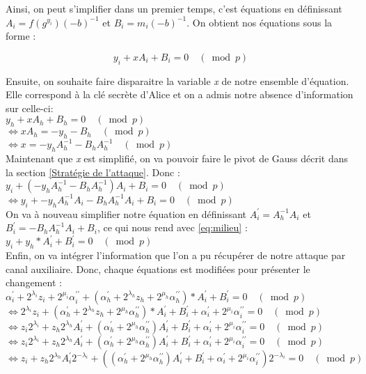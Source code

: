\documentclass{backend}
\begin{document}
Ainsi, on peut s'implifier dans un premier temps, c'est équations en définissant $ A_{i} =  f\left(g^{y_{i}}\right) (-b)^{-1}$ et $ B_{i} = m_{i}(-b)^{-1}$. On obtient nos équations sous la forme :

$$ y_{i}+x A_{i} + B_{i} = 0 \quad(\bmod p)$$

Ensuite, on souhaite faire disparaitre la variable \textit{x} de notre ensemble d'équation. Elle correspond à la clé secrète d'Alice et on a admis notre absence d'information sur celle-ci: \\
$ y_{h}+x A_{h} + B_{h} = 0 \quad(\bmod p)$\\
$ \Leftrightarrow x A_{h}= -y_{h} - B_{h} \quad(\bmod p)$\\
$ \Leftrightarrow x = -y_{h}A_{h}^{-1} - B_{h}A_{h}^{-1} \quad(\bmod p)$\\

Maintenant que \textit{x} est simplifié, on va pouvoir faire le pivot de Gauss décrit dans la section \ref{Stratégie de l'attaque}.
Donc : \\$ y_{i}+(-y_{h}A_{h}^{-1} - B_{h}A_{h}^{-1})A_{i} + B_{i} = 0 \quad(\bmod p)$\\
$ \Leftrightarrow y_{i}+-y_{h}A_{h}^{-1}A_{i} - B_{h}A_{h}^{-1}A_{i} + B_{i} = 0 \quad(\bmod p)$\\
On va à nouveau simplifier notre équation en définissant $ A^{\prime}_{i} = A_{h}^{-1}A_{i}$ et $ B^{\prime}_{i} = - B_{h}A_{h}^{-1}A_{i} + B_{i} $, ce qui nous rend avec \ref{eq:milieu} : $y_{i} + y_{h} * A^{\prime}_{i} + B^{\prime}_{i} = 0 \quad(\bmod p)$\\

Enfin, on va intégrer l'information que l'on a pu récupérer de notre attaque par canal auxiliaire. Donc, chaque équations est modifiées pour présenter le changement :\\
$ \alpha_{i}^{\prime}+2^{\lambda_{i}} z_{i}+2^{\mu_{i}} \alpha_{i}^{\prime \prime} + (\alpha_{h}^{\prime}+2^{\lambda_{h}} z_{h}+2^{\mu_{h}} \alpha_{h}^{\prime \prime}) * A^{\prime}_{i} + B^{\prime}_{i} = 0 \quad(\bmod p)$\\
$ \Leftrightarrow 2^{\lambda_{i}} z_{i} + (\alpha_{h}^{\prime}+2^{\lambda_{h}} z_{h}+2^{\mu_{h}} \alpha_{h}^{\prime \prime}) * A^{\prime}_{i} + B^{\prime}_{i}+\alpha_{i}^{\prime}+2^{\mu_{i}} \alpha_{i}^{\prime \prime} = 0 \quad(\bmod p)$ \\
$ \Leftrightarrow z_{i}2^{\lambda_{i}}  +z_{h}2^{\lambda_{h}} A^{\prime}_{i} + (\alpha_{h}^{\prime}+2^{\mu_{h}} \alpha_{h}^{\prime \prime})A^{\prime}_{i} + B^{\prime}_{i}+\alpha_{i}^{\prime}+2^{\mu_{i}} \alpha_{i}^{\prime \prime} = 0 \quad(\bmod p)$\\
$ \Leftrightarrow z_{i}2^{\lambda_{i}}  +z_{h}2^{\lambda_{h}} A^{\prime}_{i} +(\alpha_{h}^{\prime}+2^{\mu_{h}} \alpha_{h}^{\prime \prime})A^{\prime}_{i} + B^{\prime}_{i}+\alpha_{i}^{\prime}+2^{\mu_{i}} \alpha_{i}^{\prime \prime} = 0 \quad(\bmod p)$\\
$ \Leftrightarrow z_{i}  +z_{h}2^{\lambda_{h}} A^{\prime}_{i}2^{-\lambda_{i}} +((\alpha_{h}^{\prime}+2^{\mu_{h}} \alpha_{h}^{\prime \prime})A^{\prime}_{i} + B^{\prime}_{i}+\alpha_{i}^{\prime}+2^{\mu_{i}} \alpha_{i}^{\prime \prime}) 2^{-\lambda_{i}}= 0 \quad(\bmod p)$\\
\end{document}
